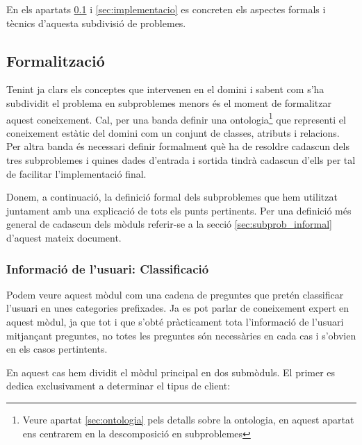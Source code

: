 \documentclass[11pt,a4paper]{article}
\begin{document}
En els apartats \ref{sec:formalitzacio} i \ref{sec:implementacio} es concreten els aspectes formals i tècnics d'aquesta subdivisió de problemes.


\subsection{Formalització}
\label{sec:formalitzacio}
Tenint ja clars els conceptes que intervenen en el domini i sabent com s'ha subdividit el problema en subproblemes menors és el moment de formalitzar aquest coneixement. Cal, per una banda definir una ontologia\footnote{Veure apartat \ref{sec:ontologia} pels detalls sobre la ontologia, en aquest apartat ens centrarem en la descomposició en subproblemes} que representi el coneixement estàtic del domini com un conjunt de classes, atributs i relacions. Per altra banda és necessari definir formalment què ha de resoldre cadascun dels tres subproblemes i quines dades d'entrada i sortida tindrà cadascun d'ells per tal de facilitar l'implementació final.

Donem, a continuació, la definició formal dels subproblemes que hem utilitzat juntament amb una explicació de tots els punts pertinents. Per una definició més general de cadascun dels mòduls referir-se a la secció \ref{sec:subprob_informal} d'aquest mateix document.

\subsubsection{Informació de l'usuari: Classificació}

Podem veure aquest mòdul com una cadena de preguntes que pretén classificar l'usuari en unes categories prefixades. Ja es pot parlar de coneixement expert en aquest mòdul, ja que tot i que s'obté pràcticament tota l'informació de l'usuari mitjançant preguntes, no totes les preguntes són necessàries en cada cas i s'obvien en els casos pertintents.

En aquest cas hem dividit el mòdul principal en dos submòduls. El primer es dedica exclusivament a determinar el tipus de client:
\end{document}
